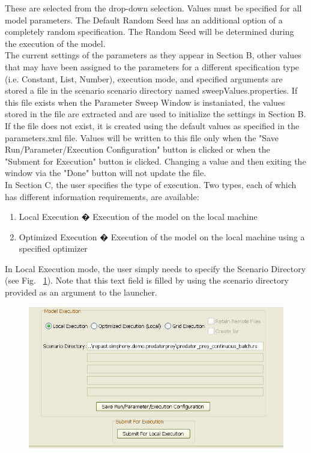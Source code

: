 \documentclass[11pt]{amsart}
\begin{document}
These are selected from the drop-down selection. Values must be specified for all model parameters. The Default Random Seed has an additional option of a completely random specification. The Random Seed will be determined during the execution of the model.\\

The current settings of the parameters as they appear in Section B, other values that may have been assigned to the parameters for a different specification type (i.e. Constant, List, Number), execution mode, and specified arguments are stored a file in the scenario scenario directory named sweepValues.properties. If this file exists when the Parameter Sweep Window is instaniated, the values stored in the file are extracted and are used to initialize the settings in Section B. If the file does not exist, it is created using the default values as specified in the parameters.xml file. Values will be written to this file only when the "Save Run/Parameter/Execution Configuration" button is clicked or when the "Subment for Execution" button is clicked. Changing a value and then exiting the window via the "Done" button will not update the file.\\


In Section C, the user specifies the type of execution. Two types, each of which has different information requirements, are available:
\begin{enumerate}
\item Local Execution � Execution of the model on the local machine
\item Optimized Execution � Execution of the model on the local machine using a specified optimizer
\end{enumerate}
\vspace{.2in}

In Local Execution mode, the user simply needs to specify the Scenario Directory (see Fig. ~\ref{fig:sweep4a}). Note that this text field is filled by using the scenario directory provided as an argument to the launcher.\\

\begin{figure}[h]
\begin{center}
\vspace{.2in}
\centerline {
\includegraphics{images/sweep4a.jpg}
}
\caption{}
\label{fig:sweep4a}
\end{center}
\end{figure}
\end{document}
